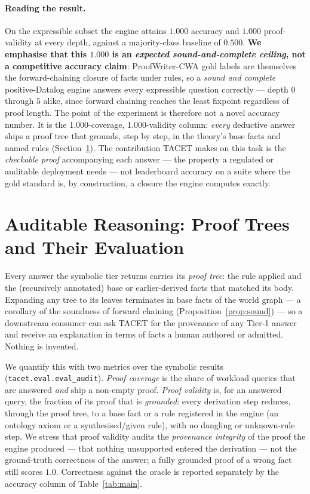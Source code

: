 \documentclass[11pt]{article}
\theoremstyle{plain}
\newcommand{\pwAccOverall}{1.000}
\newcommand{\pwProofCov}{1.000}
\newcommand{\pwProofVal}{1.000}
\renewcommand{\pwAccOverall}{1.000}
\renewcommand{\pwProofCov}{1.000}
\renewcommand{\pwProofVal}{1.000}
\begin{document}
\paragraph{Reading the result.} On the expressible subset the engine attains
$\pwAccOverall{}$ accuracy and $\pwProofVal{}$ proof-validity at every depth,
against a majority-class baseline of $0.500$. \textbf{We emphasise that this
$1.000$ is an \emph{expected sound-and-complete ceiling}, not a competitive
accuracy claim}: ProofWriter-CWA
gold labels are themselves the forward-chaining closure of facts under rules, so
a \emph{sound and complete} positive-Datalog engine answers every expressible
question correctly --- depth $0$ through $5$ alike, since forward chaining
reaches the least fixpoint regardless of proof length. The point of the
experiment is therefore not a novel accuracy number. It is the
\pwProofCov{}-coverage, \pwProofVal{}-validity column: \emph{every} deductive
answer ships a proof tree that grounds, step by step, in the theory's base facts
and named rules (Section~\ref{sec:audit}). The contribution TACET makes on this
task is the \emph{checkable proof} accompanying each answer --- the property a
regulated or auditable deployment needs --- not leaderboard accuracy on a suite
where the gold standard is, by construction, a closure the engine computes
exactly.

\section{Auditable Reasoning: Proof Trees and Their Evaluation}
\label{sec:audit}

Every answer the symbolic tier returns carries its \emph{proof tree}: the rule
applied and the (recursively annotated) base or earlier-derived facts that
matched its body. Expanding any tree to its leaves terminates in base facts of
the world graph --- a corollary of the soundness of forward chaining
(Proposition~\ref{prop:sound}) --- so a downstream consumer can ask TACET for
the provenance of any Tier-1 answer and receive an explanation in terms of
facts a human authored or admitted. Nothing is invented.

We quantify this with two metrics over the symbolic results
(\texttt{tacet.eval.eval\_audit}). \emph{Proof coverage} is the share of workload
queries that are answered \emph{and} ship a non-empty proof. \emph{Proof
validity} is, for an answered query, the fraction of its proof that is
\emph{grounded}: every derivation step reduces, through the proof tree, to a
base fact or a rule registered in the engine (an ontology axiom or a
synthesised/given rule), with no dangling or unknown-rule step. We stress that
proof validity audits the \emph{provenance integrity} of the proof the engine
produced --- that nothing unsupported entered the derivation --- not the
ground-truth correctness of the answer; a fully grounded proof of a wrong fact
still scores $1.0$. Correctness against the oracle is reported separately by the
accuracy column of Table~\ref{tab:main}.
\end{document}
